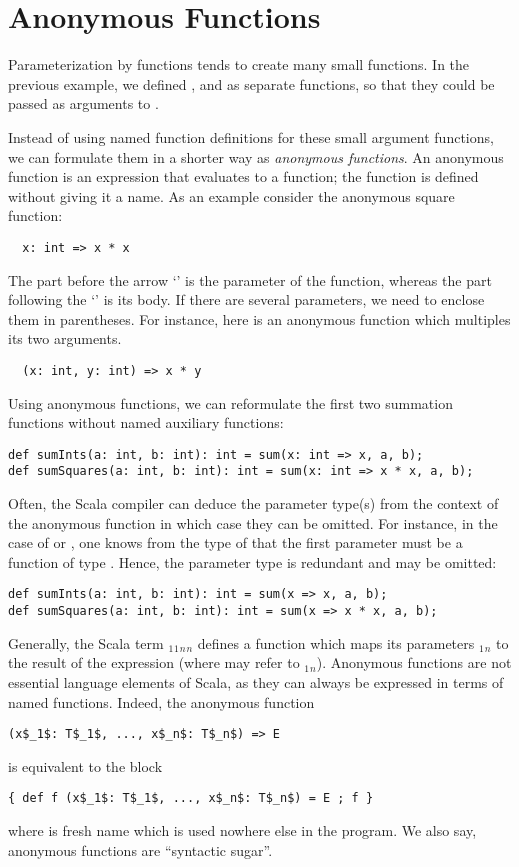 \section{Anonymous Functions}

Parameterization by functions tends to create many small functions. In
the previous example, we defined ,  and
 as separate functions, so that they could be 
passed as arguments to .

Instead of using named function definitions for these small argument
functions, we can formulate them in a shorter way as {\em anonymous
functions}. An anonymous function is an expression that evaluates to a
function; the function is defined without giving it a name. As an
example consider the anonymous square function:
\begin{lstlisting}
  x: int => x * x
\end{lstlisting}
The part before the arrow `\code{=>}' is the parameter of the function,
whereas the part following the `\code{=>}' is its body. If there are
several parameters, we need to enclose them in parentheses. For
instance, here is an anonymous function which multiples its two arguments.
\begin{lstlisting}
  (x: int, y: int) => x * y
\end{lstlisting}
Using anonymous functions, we can reformulate the first two summation
functions without named auxiliary functions:
\begin{lstlisting}
def sumInts(a: int, b: int): int = sum(x: int => x, a, b);
def sumSquares(a: int, b: int): int = sum(x: int => x * x, a, b);
\end{lstlisting}
Often, the Scala compiler can deduce the parameter type(s) from the
context of the anonymous function in which case they can be omitted.
For instance, in the case of  or , one
knows from the type of  that the first parameter must be a
function of type .  Hence, the parameter type
 is redundant and may be omitted:
\begin{lstlisting}
def sumInts(a: int, b: int): int = sum(x => x, a, b);
def sumSquares(a: int, b: int): int = sum(x => x * x, a, b);
\end{lstlisting}

Generally, the Scala term
$_1$$_1$$_n$$_n$ 
defines a function which maps its parameters
$_1$$_n$ to the result of the expression 
(where  may refer to $_1$$_n$).  Anonymous
functions are not essential language elements of Scala, as they can
always be expressed in terms of named functions. Indeed, the 
anonymous function
\begin{lstlisting}
(x$_1$: T$_1$, ..., x$_n$: T$_n$) => E
\end{lstlisting}
is equivalent to the block
\begin{lstlisting}
{ def f (x$_1$: T$_1$, ..., x$_n$: T$_n$) = E ; f }
\end{lstlisting}
where  is fresh name which is used nowhere else in the program.
We also say, anonymous functions are ``syntactic sugar''.

